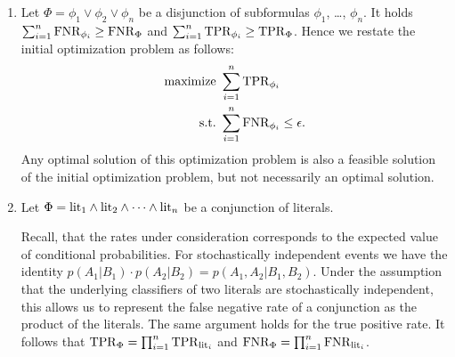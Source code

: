 \begin{enumerate}
\item Let $\Phi = \phi_1 \lor \phi_2 \lor \phi_n$ be a disjunction of
  subformulas $\phi_1$, \dots, $\phi_n$.
  It holds $\sum_{i=1}^n \mathrm{FNR}_{\phi_i} \geq \mathrm{FNR}_{\Phi}$ and
  $\sum_{i=1}^n \mathrm{TPR}_{\phi_i} \geq \mathrm{TPR}_{\Phi}$. Hence
  we restate the initial optimization problem as follows:
  \begin{align}
    \textrm{maximize} &\ \sum_{i=1}^n \mathrm{TPR}_{\phi_i}\\
    \textrm{s.t.} &\ \sum_{i=1}^n \mathrm{FNR}_{\phi_i} \leq \epsilon\text.
    \label{eq:optimization2}
  \end{align}
  Any optimal solution of this optimization problem is also a
  feasible solution of the initial optimization problem, but not necessarily
  an optimal solution.
\item Let $\Phi = \mathrm{lit}_1 \land \mathrm{lit}_2 \land \dots \land \mathrm{lit}_n$
  be a conjunction of literals.

  Recall, that the rates under consideration corresponds
  to the expected value of conditional probabilities.
  For stochastically independent events we have the identity 
  $p(A_1|B_1)\cdot p(A_2|B_2) = p(A_1,A_2|B_1,B_2)$. Under the assumption that
  the underlying classifiers of two literals are stochastically independent,
  this allows us to represent the false negative rate of a conjunction as the
  product of the literals. The same argument holds for the true positive rate.
  It follows that $\mathrm{TPR}_\Phi = \prod_{i=1}^n \mathrm{TPR}_{\mathrm{lit}_i}$ and
  $\mathrm{FNR}_\Phi = \prod_{i=1}^n \mathrm{FNR}_{\mathrm{lit}_i}$.
  

\end{enumerate}

